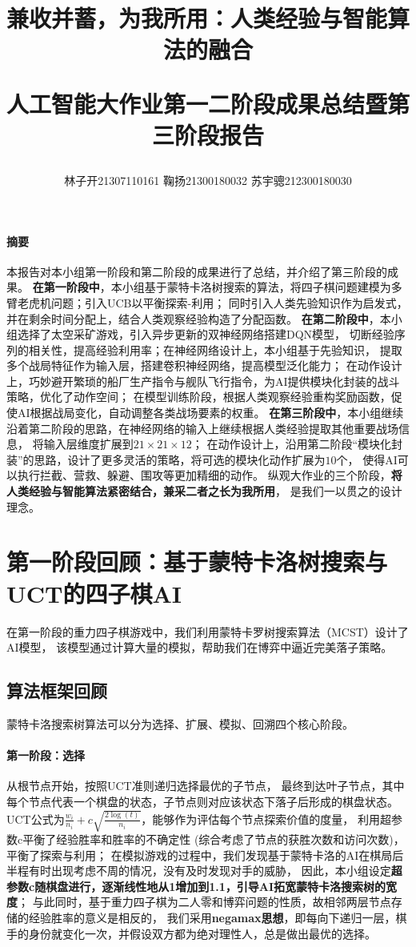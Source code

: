 \documentclass{article}
\title{兼收并蓄，为我所用：人类经验与智能算法的融合

人工智能大作业第一二阶段成果总结暨第三阶段报告}
\author{林子开21307110161 鞠扬21300180032 苏宇骢212300180030}
\begin{document}
\maketitle

\paragraph*{摘要}本报告对本小组第一阶段和第二阶段的成果进行了总结，并介绍了第三阶段的成果。
\textbf{在第一阶段中}，本小组基于蒙特卡洛树搜索的算法，将四子棋问题建模为多臂老虎机问题；引入UCB以平衡探索-利用；
同时引入人类先验知识作为启发式，并在剩余时间分配上，结合人类观察经验构造了分配函数。
\textbf{在第二阶段中}，本小组选择了太空采矿游戏，引入异步更新的双神经网络搭建DQN模型，
切断经验序列的相关性，提高经验利用率；在神经网络设计上，本小组基于先验知识，
提取多个战局特征作为输入层，搭建卷积神经网络，提高模型泛化能力；
在动作设计上，巧妙避开繁琐的船厂生产指令与舰队飞行指令，为AI提供模块化封装的战斗策略，优化了动作空间；
在模型训练阶段，根据人类观察经验重构奖励函数，促使AI根据战局变化，自动调整各类战场要素的权重。
\textbf{在第三阶段中}，本小组继续沿着第二阶段的思路，在神经网络的输入上继续根据人类经验提取其他重要战场信息，
将输入层维度扩展到$21\times 21 \times 12$；
在动作设计上，沿用第二阶段“模块化封装”的思路，设计了更多灵活的策略，将可选的模块化动作扩展为$10$个，
使得AI可以执行拦截、营救、躲避、围攻等更加精细的动作。
纵观大作业的三个阶段，\textbf{将人类经验与智能算法紧密结合，兼采二者之长为我所用}，
是我们一以贯之的设计理念。

\tableofcontents

\section{第一阶段回顾：基于蒙特卡洛树搜索与UCT的四子棋AI}
在第一阶段的重力四子棋游戏中，我们利用蒙特卡罗树搜索算法（MCST）设计了AI模型，
该模型通过计算大量的模拟，帮助我们在博弈中逼近完美落子策略。

\subsection{算法框架回顾}
蒙特卡洛搜索树算法可以分为选择、扩展、模拟、回溯四个核心阶段。

\paragraph{第一阶段：选择} 从根节点开始，按照UCT准则递归选择最优的子节点，
最终到达叶子节点，其中每个节点代表一个棋盘的状态，子节点则对应该状态下落子后形成的棋盘状态。
UCT公式为$\frac{w_i}{n_i} + c\sqrt{\frac{2 \log(t)}{n_i}}$，能够作为评估每个节点探索价值的度量，
利用超参数c平衡了经验胜率和胜率的不确定性
(综合考虑了节点的获胜次数和访问次数)，平衡了探索与利用；
在模拟游戏的过程中，我们发现基于蒙特卡洛的AI在棋局后半程有时出现考虑不周的情况，没有及时发现对手的威胁，
因此，本小组设定\textbf{超参数c随棋盘进行，逐渐线性地从1增加到1.1，引导AI拓宽蒙特卡洛搜索树的宽度}；
与此同时，基于重力四子棋为二人零和博弈问题的性质，故相邻两层节点存储的经验胜率的意义是相反的，
我们采用\textbf{negamax思想}，即每向下递归一层，棋手的身份就变化一次，并假设双方都为绝对理性人，总是做出最优的选择。
\end{document}
